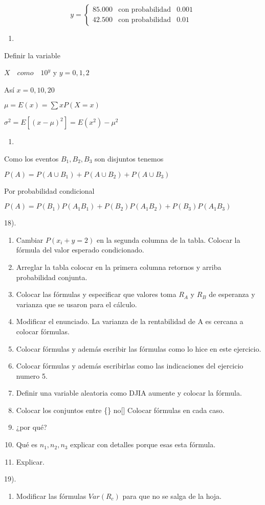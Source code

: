 \documentclass[12pt,]{article}
\providecommand{\tightlist}{%
  \setlength{\itemsep}{0pt}\setlength{\parskip}{0pt}}
\begin{document}
\[y=\left\{
\begin{matrix}
85.000 & \text{con probabilidad}& 0.001\\
42.500 & \text{con probabilidad}& 0.01
\end{matrix}
\right .
\]

\begin{enumerate}
\def\labelenumi{\arabic{enumi}.}
\setcounter{enumi}{3}
\item
\end{enumerate}

Definir la variable

\(X \quad como\quad 10^y\) y \(y={0,1,2}\)

Así \(x={0,10,20}\)

\(\mu=E(x)= \sum xP(X=x)\)

\(\sigma^2=E[(x-\mu)^2]=E(x^2)-\mu^2\)

\begin{enumerate}
\def\labelenumi{\arabic{enumi}.}
\setcounter{enumi}{4}
\item
\end{enumerate}

Como los eventos \(B_1, B_2, B_3\) son disjuntos tenemos

\(P(A)=P(A\cup B_1) + P(A\cup B_2) + P(A\cup B_3)\)

Por probabilidad condicional

\(P(A)= P(B_1)P(A_1B_1)+P(B_2)P(A_1B_2)+P(B_3)P(A_1B_3)\)

18).

\begin{enumerate}
\def\labelenumi{\arabic{enumi}.}
\item
  Cambiar \(P(x_i+y=2)\) en la segunda columna de la tabla. Colocar la
  fórmula del valor esperado condicionado.
\item
  Arreglar la tabla colocar en la primera columna retornos y arriba
  probabilidad conjunta.
\item
  Colocar las fórmulas y especificar que valores toma \(R_A\) y \(R_B\)
  de esperanza y varianza que se usaron para el cálculo.
\item
  Modificar el enunciado. La varianza de la rentabilidad de A es cercana
  a colocar fórmulas.
\item
  Colocar fórmulas y además escribir las fórmulas como lo hice en este
  ejercicio.
\item
  Colocar fórmulas y además escribirlas como las indicaciones del
  ejercicio numero 5.
\item
  Definir una variable aleatoria como DJIA aumente y colocar la fórmula.
\item
  Colocar los conjuntos entre \{\} no{[}{]} Colocar fórmulas en cada
  caso.
\item
  ¿por qué?
\item
  Qué es \(n_1,n_2,n_3\) explicar con detalles porque esas esta fórmula.
\item
  Explicar.
\end{enumerate}

19).

\begin{enumerate}
\def\labelenumi{\arabic{enumi}.}
\setcounter{enumi}{4}
\tightlist
\item
  Modificar las fórmulas \(Var(R_c)\) para que no se salga de la hoja.
\end{enumerate}
\end{document}

